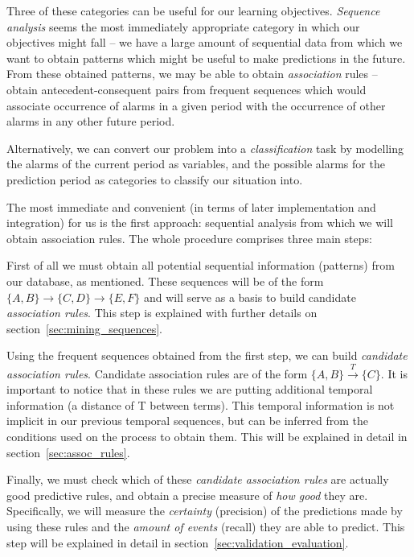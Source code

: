 \documentclass[a4paper,12pt]{article}
\begin{document}
Three of these categories can be useful for our learning objectives. \emph{Sequence analysis} seems the most immediately appropriate category in which our objectives might fall -- we have a large amount of sequential data from which we want to obtain patterns which might be useful to make predictions in the future. From these obtained patterns, we may be able to obtain \emph{association} rules -- obtain antecedent-consequent pairs from frequent sequences which would associate occurrence of alarms in a given period with the occurrence of other alarms in any other future period. 

Alternatively, we can convert our problem into a \emph{classification} task by modelling the alarms of the current period as variables, and the possible alarms for the prediction period as categories to classify our situation into.

The most immediate and convenient (in terms of later implementation and integration) for us is the first approach: sequential analysis from which we will obtain association rules. The whole procedure comprises three main steps:

First of all we must obtain all potential sequential information (patterns) from our database, as mentioned. These sequences will be of the form $\{A, B\} \longrightarrow \{C, D\} \longrightarrow \{E, F\}$ and will serve as a basis to build candidate \emph{association rules}. This step is explained with further details on section~\ref{sec:mining_sequences}.

Using the frequent sequences obtained from the first step, we can build \emph{candidate association rules}. Candidate association rules are of the form $\{A, B\} \xrightarrow{T} \{C\}$. It is important to notice that in these rules we are putting additional temporal information (a distance of T between terms). This temporal information is not implicit in our previous temporal sequences, but can be inferred from the conditions used on the process to obtain them. This will be explained in detail in section~\ref{sec:assoc_rules}.

Finally, we must check which of these \emph{candidate association rules} are actually good predictive rules, and obtain a precise measure of \emph{how good} they are. Specifically, we will measure the \emph{certainty} (precision) of the predictions made by using these rules and the \emph{amount of events} (recall) they are able to predict. This step will be explained in detail in section~\ref{sec:validation_evaluation}.
\end{document}
